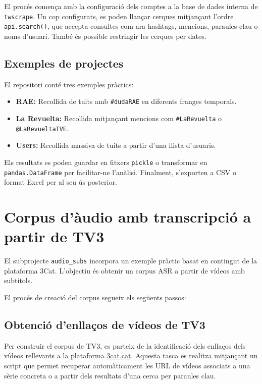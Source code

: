 \documentclass[11pt,a4paper]{article}
\begin{document}
El procés comença amb la configuració dels comptes a la base de dades interna de \texttt{twscrape}. Un cop configurats, es poden llançar cerques mitjançant l'ordre \texttt{api.search()}, que accepta consultes com ara hashtags, mencions, paraules clau o noms d’usuari. També és possible restringir les cerques per dates.

\subsection{Exemples de projectes}

El repositori conté tres exemples pràctics:

\begin{itemize}
    \item \textbf{RAE:} Recollida de tuits amb \texttt{\#dudaRAE} en diferents franges temporals.
  \item \textbf{La Revuelta:} Recollida mitjançant mencions com \texttt{\#LaRevuelta} o \texttt{@LaRevueltaTVE}.
  \item \textbf{Users:} Recollida massiva de tuits a partir d'una llista d'usuaris.
\end{itemize}

Els resultats es poden guardar en fitxers \texttt{pickle} o transformar en \texttt{pandas.DataFrame} per facilitar-ne l’anàlisi. Finalment, s’exporten a CSV o format Excel per al seu ús posterior.


\section{Corpus d'àudio amb transcripció a partir de TV3}

El subprojecte \texttt{audio\_subs} incorpora un exemple pràctic basat en contingut de la plataforma 3Cat. L'objectiu és obtenir un corpus ASR a partir de vídeos amb subtítols. 

El procés de creació del corpus segueix els següents passos:

\subsection{Obtenció d'enllaços de vídeos de TV3}

Per construir el corpus de TV3, es parteix de la identificació dels enllaços dels vídeos rellevants a la plataforma \url{3cat.cat}. Aquesta tasca es realitza mitjançant un script que permet recuperar automàticament les URL de vídeos associats a una sèrie concreta o a partir dels resultats d’una cerca per paraules clau.
\end{document}
